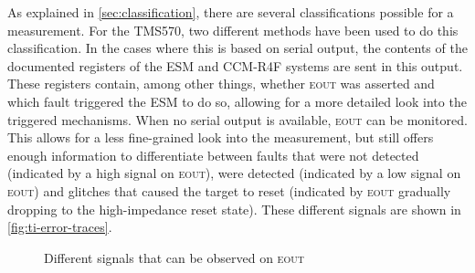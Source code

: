 \documentclass[10pt]{article}
\newcommand{\TI}{TMS570\xspace}
\newcommand{\errorpin}{\textsc{eout}\xspace}
\begin{document}
      As explained in \autoref{sec:classification}, there are several classifications possible for a measurement. For the \TI, two different methods have been used to do this classification. In the cases where this is based on serial output, the contents of the documented registers \cite{texas_instruments_technical_2015} of the ESM and CCM-R4F systems are sent in this output. These registers contain, among other things, whether \errorpin was asserted and which fault triggered the ESM to do so, allowing for a more detailed look into the triggered mechanisms. When no serial output is available, \errorpin can be monitored. This allows for a less fine-grained look into the measurement, but still offers enough information to differentiate between faults that were not detected (indicated by a high signal on \errorpin), were detected (indicated by a low signal on \errorpin) and glitches that caused the target to reset (indicated by \errorpin gradually dropping to the high-impedance reset state). These different signals are shown in \autoref{fig:ti-error-traces}. 

      \begin{figure}[H]
          \centering
          \caption{Different signals that can be observed on \errorpin}
          \label{fig:ti-error-traces}
      \end{figure}
\end{document}
